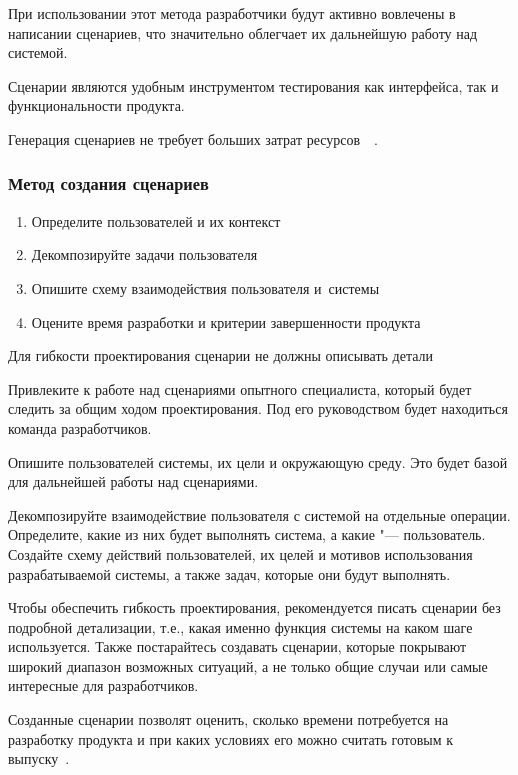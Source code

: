 \documentclass{../industrial-development}
\begin{document}
При использовании этот метода разработчики будут активно вовлечены в написании сценариев, что значительно облегчает их дальнейшую работу над системой.

Сценарии являются удобным инструментом тестирования как интерфейса, так и функциональности продукта.

Генерация сценариев не требует больших затрат ресурсов~\cite[с.~116]{Golovach}~\cite{Usabilitynet-scenarios}.

\begin{frame} \frametitle{Метод создания сценариев}
   \begin{enumerate}
    \item Определите пользователей и их контекст
    \item Декомпозируйте задачи пользователя
    \item Опишите схему взаимодействия пользователя и~системы
    \item Оцените время разработки и критерии завершенности продукта
   \end{enumerate}
   
   \begin{block}{}
    Для гибкости проектирования сценарии не должны описывать детали
  \end{block}
\end{frame}

\lecturenotes

Привлеките к работе над сценариями опытного специалиста, который будет следить за общим ходом проектирования. Под его руководством будет находиться команда разработчиков.

Опишите пользователей системы, их цели и окружающую среду. Это будет базой для дальнейшей работы над сценариями.

Декомпозируйте взаимодействие пользователя с системой на отдельные операции. Определите, какие из них будет выполнять система, а какие "--- пользователь. Создайте схему действий пользователей, их целей и мотивов использования разрабатываемой системы, а также задач, которые они будут выполнять.

Чтобы обеспечить гибкость проектирования, рекомендуется писать сценарии без подробной детализации, т.е., какая именно функция системы на каком шаге используется. Также постарайтесь создавать сценарии, которые покрывают широкий диапазон возможных ситуаций, а не только общие случаи или самые интересные для разработчиков.

Созданные сценарии позволят оценить, сколько времени потребуется на разработку продукта и при каких условиях его можно считать готовым к выпуску~\cite{Usabilitynet-scenarios}.
\end{document}
